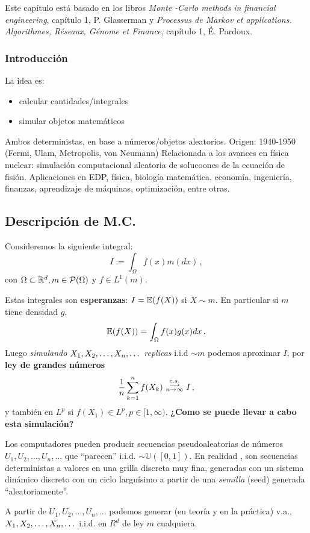 Este capítulo está basado en los libros \textit{Monte -Carlo methods in financial engineering}, capítulo 1, P. Glasserman \cite{glass} y \textit{Processus de Markov et applications. Algorithmes, Réseaux, Génome et Finance}, capítulo 1, É. Pardoux\cite{pardoux}.
\subsubsection{Introducción}
La idea es:
\begin{itemize}
    \item calcular cantidades/integrales
    \item simular objetos matemáticos
\end{itemize}
Ambos deterministas, en base a números/objetos aleatorios.
\newp Origen: 1940-1950 (Fermi, Ulam, Metropolis, von Neumann) Relacionada a los avances en física nuclear: simulación computacional aleatoria de solucoones de la ecuación de fisión. \newline Aplicaciones en EDP, física, biología matemática, economía, ingeniería, finanzas, aprendizaje de máquinas, optimización, entre otras.

\subsection{Descripción de M.C.}
\newp Consideremos la siguiente integral:
$$ I:=\displaystyle\int_\Omega f(x)m(dx) \, ,$$
con $\Omega\subset\mathbb{R}^d,m\in\mathcal{P}(\Omega)$ y $f\in L^1(m)$.

Estas integrales son \textbf{esperanzas}: $I=\mathbb{E}(f(X))$ si $X\sim m$.
En particular si $m$ tiene densidad $g$,
$$ \mathbb{E}(f(X)) = \displaystyle \int_\Omega f(x)g(x)dx \, .$$
Luego \textit{simulando} $X_1,X_2,\dots,X_n,\dots$ \textit{replicas} i.i.d $\sim m$ podemos aproximar $I$, por \textbf{ley de grandes números}
$$ \displaystyle\frac{1}{n}\sum^n_{k=1}f(X_k)\mbox{ }\overset{c.s.}{\substack{\longrightarrow \\n \to \infty}}\mbox{ } I \, ,$$
y también en $L^p$ si $f(X_1)\in L^p, p\in[1,\infty)$.
\newp \textbf{¿Como se puede llevar a cabo esta simulación?}

Los computadores pueden producir secuencias pseudoaleatorias de números $U_1,U_2,\dots,U_n,\dots$ que ``parecen'' i.i.d. $\sim \mathbb{U}([0,1])$. En realidad , son secuencias deterministas a valores en una grilla discreta muy fina, generadas con un sistema dinámico discreto con un ciclo larguísimo a partir de una \textit{semilla} (seed) generada ``aleatoriamente''.

A partir de $U_1,U_2,\dots,U_n,\dots$ podemos generar (en teoría y en la práctica) v.a., $X_1,X_2,\dots,X_n,\dots$ i.i.d. en $R^d$ de ley $m$ cualquiera.


